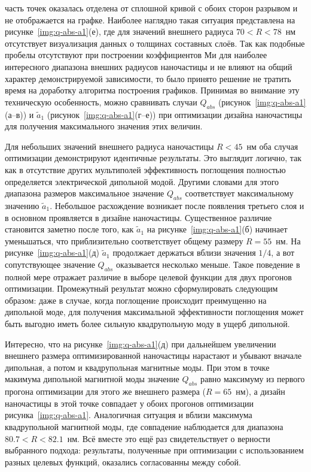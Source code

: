 часть точек оказалась отделена от сплошной кривой с обоих сторон
разрывом и не отображается на графке.  Наиболее наглядно такая
ситуация представлена на рисунке~\ref{img:q-abs-a1}(е), где для
значений внешнего радиуса $70<R<78$~нм отсутствует визуализация данных
о толщинах составных слоёв.  Так как подобные пробелы отсутствуют при
построении коэффициентов Ми для наиболее интересного диапазона внешних
радиусов наночастицы и не влияют на общий характер демонстрируемой
зависимости, то было принято решение не тратить время на доработку
алгоритма построения графиков.  Принимая во внимание эту техническую
особенность, можно сравнивать случаи $Q_{abs}$
(рисунок~\ref{img:q-abs-a1}(а--в)) и $\tilde{a}_1$
(рисунок~\ref{img:q-abs-a1}(г--е)) при оптимизации дизайна наночастицы
для получения максимального значения этих величин.

Для небольших значений внешнего радиуса наночастицы $R<45$~нм оба
случая оптимизации демонстрируют идентичные результаты. Это выглядит
логично, так как в отсутствие других мультиполей эффективность
поглощения полностью определяется электрической дипольной
модой. Другими словами для этого диапазона размеров максимальное
значение $Q_{abs}$ соответствует максимальному значению
$\tilde{a}_1$. Небольшое расхождение возникает после появления
третьего слоя и в основном проявляется в дизайне наночастицы.
Существенное различие становится заметно после того, как $\tilde{a}_1$
на рисунке~\ref{img:q-abs-a1}(б) начинает уменьшаться, что
приблизительно соответствует общему размеру $R=55$~нм. На
рисунке~\ref{img:q-abs-a1}(д) $\tilde{a}_1$ продолжает держаться
вблизи значения $1/4$, а вот сопутствующее значение $Q_{abs}$
оказывается несколько меньше. Такое поведение в полной мере отражает
различие в выборе целевой функции для двух прогонов
оптимизации. Промежутный результат можно сформулировать следующим
образом: даже в случае, когда поглощение происходит преимущенно на
дипольной моде, для получения максимальной эффективности поглощения
может быть выгодно иметь более сильную квадрупольную моду в ущерб
дипольной.

Интересно, что на рисунке~\ref{img:q-abs-a1}(д) при дальнейшем
увеличении внешнего размера оптимизированной наночастицы нарастают и
убывают вначале дипольная, а потом и квадрупольная магнитные моды. При
этом в точке макимума дипольной магнитной моды значение $Q_{abs}$
равно максимуму из первого прогона оптимизации для этого же внешнего
размера ($R=65$~нм), а дизайн наночастицы в этой точке совпадает у
обоих прогонов оптимизации рисунка~\ref{img:q-abs-a1}.  Аналогичная
ситуация и вблизи максимума квадрупольной магнитной моды, где
совпадение наблюдается для диапазона $80.7<R<82.1$~нм.  Всё вместе это
ещё раз свидетельствует о верности выбранного подхода: результаты,
полученные при оптимизации с использованием разных целевых функций,
оказались согласованны между собой. 

